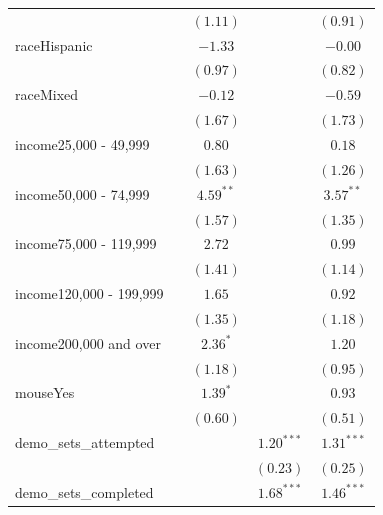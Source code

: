 \documentclass[
  12,
  letterpaper,
  DIV=11,
  numbers=noendperiod]{scrartcl}
\begin{document}
\begin{table}
{\begin{center}
\begin{tabular}{l c c c c}
                        &               & $(1.11)$      &               & $(0.91)$      \\
raceHispanic            &               & $-1.33$       &               & $-0.00$       \\
                        &               & $(0.97)$      &               & $(0.82)$      \\
raceMixed               &               & $-0.12$       &               & $-0.59$       \\
                        &               & $(1.67)$      &               & $(1.73)$      \\
income25,000 - 49,999   &               & $0.80$        &               & $0.18$        \\
                        &               & $(1.63)$      &               & $(1.26)$      \\
income50,000 - 74,999   &               & $4.59^{**}$   &               & $3.57^{**}$   \\
                        &               & $(1.57)$      &               & $(1.35)$      \\
income75,000 - 119,999  &               & $2.72$        &               & $0.99$        \\
                        &               & $(1.41)$      &               & $(1.14)$      \\
income120,000 - 199,999 &               & $1.65$        &               & $0.92$        \\
                        &               & $(1.35)$      &               & $(1.18)$      \\
income200,000 and over  &               & $2.36^{*}$    &               & $1.20$        \\
                        &               & $(1.18)$      &               & $(0.95)$      \\
mouseYes                &               & $1.39^{*}$    &               & $0.93$        \\
                        &               & $(0.60)$      &               & $(0.51)$      \\
demo\_sets\_attempted   &               &               & $1.20^{***}$  & $1.31^{***}$  \\
                        &               &               & $(0.23)$      & $(0.25)$      \\
demo\_sets\_completed   &               &               & $1.68^{***}$  & $1.46^{***}$  \\

\end{tabular}
\end{center}}
\end{table}
\end{document}
